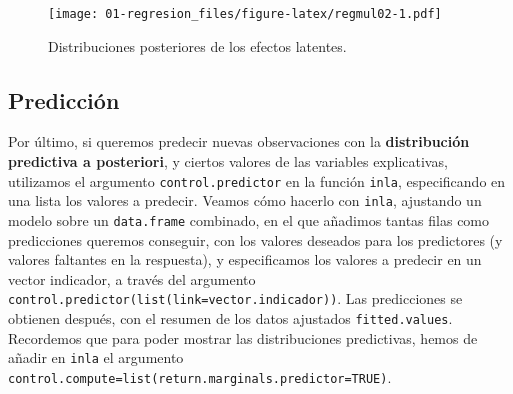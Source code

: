 \documentclass[
]{book}
\begin{document}
\begin{figure}
\centering
\texttt{[image: 01-regresion\_files/figure-latex/regmul02-1.pdf]}
\caption{\label{fig:regmul02}Distribuciones posteriores de los efectos latentes.}
\end{figure}

\hypertarget{predicciuxf3n}{%
\subsection{Predicción}\label{predicciuxf3n}}

Por último, si queremos predecir nuevas observaciones con la \textbf{distribución predictiva a posteriori}, y ciertos valores de las variables explicativas, utilizamos el argumento \texttt{control.predictor} en la función \texttt{inla}, especificando en una lista los valores a predecir. Veamos cómo hacerlo con \texttt{inla}, ajustando un modelo sobre un \texttt{data.frame} combinado, en el que añadimos tantas filas como predicciones queremos conseguir, con los valores deseados para los predictores (y valores faltantes en la respuesta), y especificamos los valores a predecir en un vector indicador, a través del argumento \texttt{control.predictor(list(link=vector.indicador))}. Las predicciones se obtienen después, con el resumen de los datos ajustados \texttt{fitted.values}. Recordemos que para poder mostrar las distribuciones predictivas, hemos de añadir en \texttt{inla} el argumento \texttt{control.compute=list(return.marginals.predictor=TRUE)}.
\end{document}
